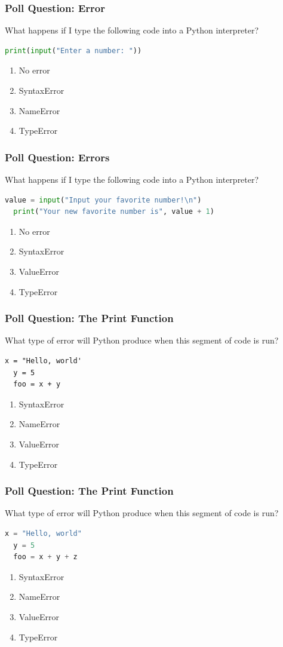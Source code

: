 \documentclass{beamer}
\begin{document}
%
%
%
\begin{frame}[fragile]
  \frametitle{Poll Question: Error}
  What happens if I type the following code into a Python interpreter?
  \begin{lstlisting}[language=Python]
  print(input("Enter a number: "))\end{lstlisting}
  \begin{enumerate}[A]
    \item No error
    \item SyntaxError
    \item NameError
    \item TypeError
  \end{enumerate}
\end{frame}

%
%
%
\begin{frame}[fragile]
  \frametitle{Poll Question: Errors}
  What happens if I type the following code into a Python interpreter?
  \begin{lstlisting}[language=Python]
  value = input("Input your favorite number!\n")
  print("Your new favorite number is", value + 1)\end{lstlisting}
  \begin{enumerate}[A]
    \item No error
    \item SyntaxError
    \item ValueError
    \item TypeError
  \end{enumerate}
\end{frame}

%
%
%
\begin{frame}[fragile]
  \frametitle{Poll Question: The Print Function}
  What type of error will Python produce when this segment of code is run?
  \begin{lstlisting}[]
  x = "Hello, world'
  y = 5
  foo = x + y\end{lstlisting}
  \begin{enumerate}[A]
    \item SyntaxError
    \item NameError
    \item ValueError
    \item TypeError
  \end{enumerate}
\end{frame}


%
%
%
\begin{frame}[fragile]
  \frametitle{Poll Question: The Print Function}
  What type of error will Python produce when this segment of code is run?
  \begin{lstlisting}[language=Python]
  x = "Hello, world"
  y = 5
  foo = x + y + z\end{lstlisting}
  \begin{enumerate}[A]
    \item SyntaxError
    \item NameError
    \item ValueError
    \item TypeError
  \end{enumerate}
\end{frame}
\end{document}
